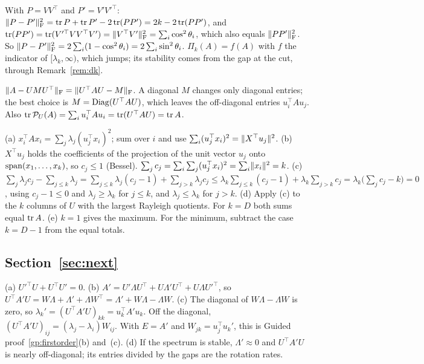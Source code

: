 With $P=VV^\top$ and $P'=V'V'^\top$: $\lVert P-P'\rVert_{\mathrm{F}}^2=\operatorname{tr} P+\operatorname{tr} P'-2\operatorname{tr}(PP')=2k-2\operatorname{tr}(PP')$, and
$\operatorname{tr}(PP')=\operatorname{tr}(V'^\top VV^\top V')=\lVert V^\top V'\rVert_{\mathrm{F}}^2=\sum_i\cos^2\theta_i$, which also equals $\lVert PP'\rVert_{\mathrm{F}}^2$. So
$\lVert P-P'\rVert_{\mathrm{F}}^2=2\sum_i(1-\cos^2\theta_i)=2\sum_i\sin^2\theta_i$. $\Pi_k(A)=f(A)$ with $f$ the indicator of
$[\lambda_k,\infty)$, which jumps; its stability comes from the gap at the cut, through Remark~\ref{rem:dk}.

$\lVert A-UMU^\top\rVert_{\mathrm{F}}=\lVert U^\top AU-M\rVert_{\mathrm{F}}$. A diagonal $M$ changes only diagonal entries; the best choice is
$M=\operatorname{Diag}(U^\top AU)$, which leaves the off-diagonal entries $u_i^\top Au_j$. Also
$\operatorname{tr}\mathcal{P}_U(A)=\sum_iu_i^\top Au_i=\operatorname{tr}(U^\top AU)=\operatorname{tr} A$.

(a) $x_i^\top Ax_i=\sum_j\lambda_j(u_j^\top x_i)^2$; sum over $i$ and use $\sum_i(u_j^\top x_i)^2=\lVert X^\top u_j\rVert^2$.
\newline (b) $X^\top u_j$ holds the coefficients of the projection of the unit vector $u_j$ onto $\operatorname{span}(x_1,\dots,x_k)$, so
$c_j\le1$ (Bessel). $\sum_jc_j=\sum_i\sum_j(u_j^\top x_i)^2=\sum_i\lVert x_i\rVert^2=k$.
\newline (c) $\sum_j\lambda_jc_j-\sum_{j\le k}\lambda_j=\sum_{j\le k}\lambda_j(c_j-1)+\sum_{j>k}\lambda_jc_j\le\lambda_k\sum_{j\le k}(c_j-1)+\lambda_k\sum_{j>k}c_j=\lambda_k\bigl(\sum_jc_j-k\bigr)=0$,
using $c_j-1\le0$ and $\lambda_j\ge\lambda_k$ for $j\le k$, and $\lambda_j\le\lambda_k$ for $j>k$.
\newline (d) Apply (c) to the $k$ columns of $U$ with the largest Rayleigh quotients. For $k=D$ both sums equal $\operatorname{tr} A$.
\newline (e) $k=1$ gives the maximum. For the minimum, subtract the case $k=D-1$ from the equal totals.

\subsection*{Section~\ref{sec:next}}

(a) $U'^\top U+U^\top U'=0$.
\newline (b) $A'=U'\Lambda U^\top+U\Lambda'U^\top+U\Lambda U'^\top$, so $U^\top A'U=W\Lambda+\Lambda'+\Lambda W^\top=\Lambda'+W\Lambda-\Lambda W$.
\newline (c) The diagonal of $W\Lambda-\Lambda W$ is zero, so $\lambda_k'=(U^\top A'U)_{kk}=u_k^\top A'u_k$. Off the diagonal,
$(U^\top A'U)_{ij}=(\lambda_j-\lambda_i)W_{ij}$. With $E=A'$ and $W_{jk}=u_j^\top u_k'$, this is
Guided proof~\ref{gp:firstorder}(b) and~(c).
\newline (d) If the spectrum is stable, $\Lambda'\approx0$ and $U^\top A'U$ is nearly off-diagonal; its entries divided by the
gaps are the rotation rates.

